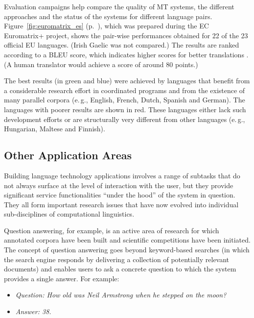 \begin{multicols}{2}
Evaluation campaigns help compare the quality of MT systems, the different approaches and the status of the systems for different language pairs. Figure~\ref{fig:euromatrix_es} (p.~\pageref{fig:euromatrix_es}), which was prepared during the EC Euromatrix+ project, shows the pair-wise performances obtained for 22 of the 23 official EU languages. (Irish Gaelic was not compared.) The results are ranked according to a BLEU score, which indicates higher scores for better translations \cite{bleu1}. (A human translator would achieve a score of around 80 points.) 

The best results (in green and blue) were achieved by languages that benefit from a considerable research effort in coordinated programs and from the existence of many parallel corpora (e.\,g., English, French, Dutch, Spanish and German). The languages with poorer results are shown in red. These languages either lack such development efforts or are structurally very different from other languages (e.\,g., Hungarian, Maltese and Finnish).

\subsection{Other Application Areas}

Building language technology applications involves a range of subtasks that do not always surface at the level of interaction with the user, but they provide significant service functionalities “under the hood” of the system in question. They all form important research issues that have now evolved into individual sub-disciplines of computational linguistics. 

 
Question answering, for example, is an active area of research for which annotated corpora have been built and scientific competitions have been initiated. The concept of question answering goes beyond keyword-based searches (in which the search engine responds by delivering a collection of potentially relevant documents) and enables users to ask a concrete question to which the system provides a single answer. For example:

\begin{itemize}
\item[] \textit{Question: How old was Neil Armstrong when he stepped on the moon?}
\item[] \textit{Answer: 38.}
\end{itemize}


\end{multicols}
